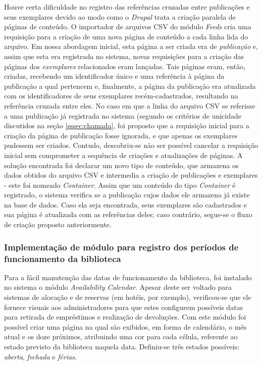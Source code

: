 \documentclass[a4paper]{article}
\begin{document}
Houve certa dificuldade no registro das referências cruzadas entre publicações e seus exemplares devido ao modo como o \textit{Drupal} trata a criação paralela de páginas de conteúdo. O importador de arquivos CSV do módulo \textit{Feeds} cria uma requisição para a criação de uma nova página de conteúdo a cada linha lida do arquivo. Em nossa abordagem inicial, esta página a ser criada era de \textit{publicação} e, assim que esta era registrada no sistema, novas requisições para a criação das páginas dos \textit{exemplares} relacionados eram lançadas. Tais páginas eram, então, criadas, recebendo um identificador único e uma referência à página da publicação a qual pertencem e, finalmente, a página da publicação era atualizada com os identificadores de seus exemplares recém-cadastrados, resultando na referência cruzada entre eles. No caso em que a linha do arquivo CSV se referisse a uma publicação já registrada no sistema (segundo os critérios de unicidade discutidos na seção \ref{sssec:chamada}, foi proposto que a requisição inicial para a criação da página de publicação fosse ignorada, e que apenas os exemplares pudessem ser criados. Contudo, descobriu-se não ser possível cancelar a requisição inicial sem comprometer a sequência de criações e atualizações de páginas. A solução encontrada foi declarar um novo tipo de conteúdo, que armazena os dados obtidos do arquivo CSV e intermedia a criação de publicações e exemplares - este foi nomeado \textit{Container}. Assim que um conteúdo do tipo \textit{Container} é registrado, o sistema verifica se a publicação cujos dados ele armazena já existe na base de dados. Caso ela seja encontrada, seus exemplares são cadastrados e sua página é atualizada com as referências deles; caso contrário, segue-se o fluxo de criação proposto anteriormente.

\subsubsection{Implementação de módulo para registro dos períodos de funcionamento da biblioteca}
Para a fácil manutenção das datas de funcionamento da biblioteca, foi instalado no sistema o módulo \textit{Availability Calendar}. Apesar deste ser voltado para sistemas de alocação e de reservas (em hotéis, por exemplo), verificou-se que ele fornece visuais aos administradores para que estes configurem possíveis datas para retirada de empréstimos e realização de devoluções. Com este módulo foi possível criar uma página na qual são exibidos, em forma de calendário, o mês atual e os doze próximos, atribuindo uma cor para cada célula, referente ao estado previsto da biblioteca naquela data. Definiu-se três estados possíveis: \textit{aberta}, \textit{fechada} e \textit{férias}.
\end{document}
